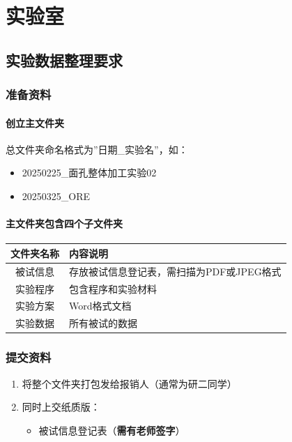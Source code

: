 \documentclass[]{ctexbook}
\providecommand{\tightlist}{%
  \setlength{\itemsep}{0pt}\setlength{\parskip}{0pt}}
\theoremstyle{definition}
\theoremstyle{definition}
\theoremstyle{definition}
\theoremstyle{definition}
\theoremstyle{remark}
\begin{document}
\part{实验室}\label{part-ux5b9eux9a8cux5ba4}

\chapter{实验数据整理要求}\label{dataarchive}

\section{准备资料}\label{ux51c6ux5907ux8d44ux6599}

\subsection{创立主文件夹}\label{ux521bux7acbux4e3bux6587ux4ef6ux5939}

总文件夹命名格式为''日期\_实验名''，如：

\begin{itemize}
\tightlist
\item
  20250225\_面孔整体加工实验02
\item
  20250325\_ORE
\end{itemize}

\subsection{主文件夹包含四个子文件夹}\label{ux4e3bux6587ux4ef6ux5939ux5305ux542bux56dbux4e2aux5b50ux6587ux4ef6ux5939}

\begin{longtable}[]{@{}cl@{}}
\toprule\noalign{}
文件夹名称 & 内容说明 \\
\midrule\noalign{}
\endhead
\bottomrule\noalign{}
\endlastfoot
被试信息 & 存放被试信息登记表，需扫描为PDF或JPEG格式 \\
实验程序 & 包含程序和实验材料 \\
实验方案 & Word格式文档 \\
实验数据 & 所有被试的数据 \\
\end{longtable}

\section{提交资料}\label{ux63d0ux4ea4ux8d44ux6599}

\begin{enumerate}
\def\labelenumi{\arabic{enumi}.}
\tightlist
\item
  将整个文件夹打包发给报销人（通常为研二同学）
\item
  同时上交纸质版：

  \begin{itemize}
  \tightlist
  \item
    被试信息登记表（\textbf{需有老师签字}）
  \end{itemize}
\end{enumerate}
\end{document}
